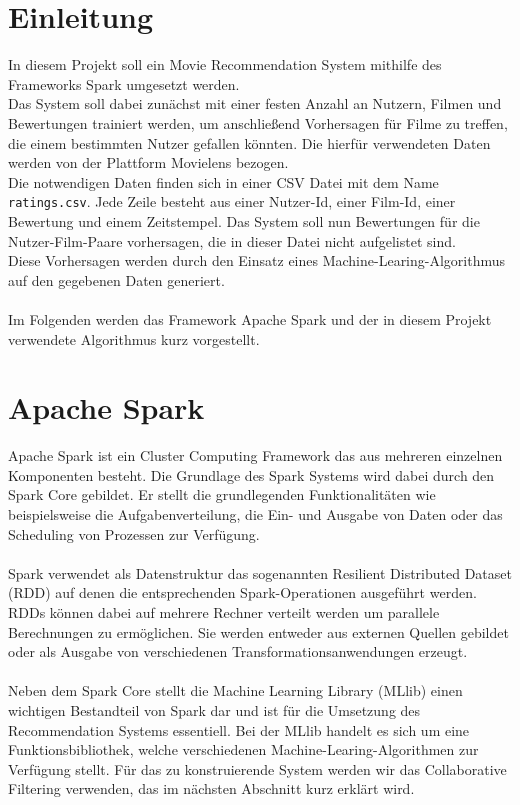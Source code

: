 \chapter{Einleitung}
In diesem Projekt soll ein \glqq Movie Recommendation System\grqq{} mithilfe des Frameworks Spark\cite{lit:INET1} umgesetzt werden.\\
Das System soll dabei zunächst mit einer festen Anzahl an Nutzern, Filmen und Bewertungen trainiert werden, um anschließend Vorhersagen für Filme zu treffen, die einem bestimmten Nutzer gefallen könnten. Die hierfür verwendeten Daten werden von der Plattform Movielens\cite{lit:INET4} bezogen.\\
Die notwendigen Daten finden sich in einer CSV Datei mit dem Name \lstinline{ratings.csv}. Jede Zeile besteht aus einer Nutzer-Id, einer Film-Id, einer Bewertung und einem Zeitstempel. Das System soll nun Bewertungen für die Nutzer-Film-Paare vorhersagen, die in dieser Datei nicht aufgelistet sind.\\
Diese Vorhersagen werden durch den Einsatz eines Machine-Learing-Algorithmus auf den gegebenen Daten generiert.\\\\
Im Folgenden werden das Framework Apache Spark und der in diesem Projekt verwendete Algorithmus kurz vorgestellt.


\chapter{Apache Spark}

Apache Spark ist ein \glqq Cluster Computing Framework\grqq{} das aus mehreren einzelnen Komponenten besteht. Die Grundlage des Spark Systems wird dabei durch den \glqq Spark Core\grqq{} gebildet. Er stellt die grundlegenden Funktionalitäten wie beispielsweise die Aufgabenverteilung, die Ein- und Ausgabe von Daten oder das Scheduling von Prozessen zur Verfügung.\\\\
Spark verwendet als Datenstruktur das sogenannten \glqq Resilient Distributed Dataset\grqq{} (RDD) auf denen die entsprechenden Spark-Operationen ausgeführt werden. RDDs können dabei auf mehrere Rechner verteilt werden um parallele Berechnungen zu ermöglichen. Sie werden entweder aus externen Quellen gebildet oder als Ausgabe von verschiedenen Transformationsanwendungen erzeugt.\\\\
Neben dem \glqq Spark Core\grqq{} stellt die Machine Learning Library (MLlib) einen wichtigen Bestandteil von Spark dar und ist für die Umsetzung des \glqq Recommendation Systems\grqq{} essentiell. Bei der MLlib handelt es sich um eine Funktionsbibliothek, welche verschiedenen Machine-Learing-Algorithmen zur Verfügung stellt. Für das zu konstruierende System werden wir das \glqq Collaborative Filtering\grqq{} verwenden, das im nächsten Abschnitt kurz erklärt wird.





